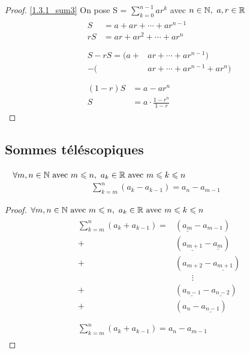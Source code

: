 \begin{proof}
	\ref{1.3.1_sum3} On pose S = $\displaystyle{\sum_{k = 0}^{n-1}ar^k}$ avec $n \in \mathbb{N},\ a, r \in \mathbb{R}$
	\begin{align*}
		&\begin{aligned}
			S &= a + ar + \cdots + ar^{n-1} \\
			rS &= ar + ar^2 + \cdots + ar^n 
		\end{aligned} 
		\\
		\\
		&\begin{aligned}
			S - rS = (a + &ar + \cdots + ar^{n-1}) \\
			- (&ar + \cdots + ar^{n-1} + ar^n)
		\end{aligned}
		\\
		\\
		&\begin{aligned}
			(1 - r)S &= a - ar^n \\
			S &= a \cdot \frac{1 - r^n}{1 - r}
		\end{aligned}
	\end{align*}
\end{proof}

\subsection{Sommes téléscopiques}
\begin{proposition}~
	$\forall m, n \in \mathbb{N} \textnormal{ avec }m \leqslant n,\ a_{k}  \in \mathbb{R} \textnormal{ avec } m \leqslant k \leqslant n$
	\begin{align*}
		\sum_{k = m}^{n} (a_k - a_{k-1}) = a_n - a_{m - 1} 
	\end{align*}
\end{proposition}

\begin{proof}
	$\forall m, n \in \mathbb{N} \textnormal{ avec }m \leqslant n,\ a_{k}  \in \mathbb{R} \textnormal{ avec } m \leqslant k \leqslant n$
	\begin{align*}
		&\begin{aligned}
			\sum_{k = m}^{n}(a_k + a_{k - 1}) = &(\underline{a_m} - a_{m-1}) \\
			+&(\underline{a_{m+1}} - \underline{a_m}) \\
			+&(a_{m+2} - \underline{a_{m+1}}) \\
			& \qquad \vdots \\
			+& (\underline{a_{n-1}} - \underline{a_{n-2}}) \\	
			+& (a_n - \underline{a_{n - 1}}) \\
		\end{aligned}
		\\
		&\begin{aligned}
			\sum_{k = m}^{n}(a_k + a_{k - 1}) = a_n - a_{m - 1}
		\end{aligned}
	\end{align*}
\end{proof}

